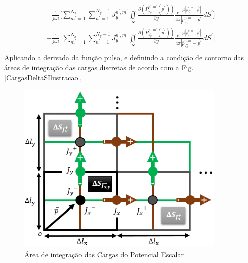 \documentclass[
	12pt,				%
	openright,			%
	oneside,			%
	a4paper,			%
	english,			%
	brazil				%
	]{abntex2}
\begin{document}
\begin{apendicesenv}
\begin{equation}
\begin{aligned}
  +    
       \frac{1}{j\omega \epsilon}\biggl[\sum_{m^{'}=1}^{N_x}\sum_{n^{'}=1}^{N_y-1} J_{y}^{n^{'},m^{'}} \iint\limits_{S}  \frac{\partial (P_{J_y}^{n^{'},m^{'}}(\overline{p^{'}})    )}{\partial y}  \frac{e^{-j k |\overline{p}_{{J_x^{-}}}^{n,m}-\overline{p^{'}}|}}{4 \pi |\overline{p}_{{J_x^{-}}}^{n,m}-\overline{p^{'}}|} dS^{'}  \biggl] \\
    -
      \frac{1}{j\omega \epsilon}\biggl[ \sum_{m^{'}=1}^{N_x}\sum_{n^{'}=1}^{N_y-1} J_{y}^{n^{'},m^{'}} \iint\limits_{S}  \frac{\partial (P_{J_y}^{n^{'},m^{'}}(\overline{p^{'}})    )}{\partial y} \frac{e^{-j k |\overline{p}_{{J_x^{+}}}^{n,m}-\overline{p^{'}}|}}{4 \pi |\overline{p}_{{J_x^{+}}}^{n,m}-\overline{p^{'}}|}dS^{'}  \biggl] \\
\end{aligned}
\end{equation}
Aplicando a derivada da função pulso, e definindo a condição de contorno das áreas de integração das cargas discretas de acordo com a Fig. \ref{CargasDeltaSIlustracao},
\begin{figure}[htb]
 \label{CargasDeltaSIlustracao}
 \centering
  \begin{minipage}{\textwidth}
    \centering
    \caption{Área de integração das Cargas do Potencial Escalar} \label{fig_minipage_imagem2}
    \includegraphics[width=10cm]{figures/CargasDeltaSIlustracao.png}
  \end{minipage}
  \hfill


\end{figure}
\end{apendicesenv}
\end{document}
